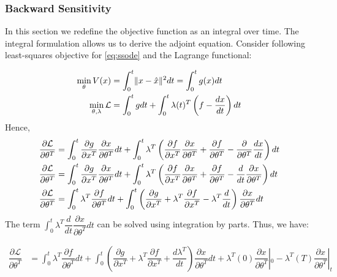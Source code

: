\documentclass[fontsize=11pt]{article}
\newcommand{\norm}[1]{\lVert #1 \rVert}
\theoremstyle{definition}
\begin{document}
\subsubsection{Backward Sensitivity}

In this section we redefine the objective function as an integral over time.
The integral formulation allows us to derive the adjoint equation.
Consider following least-squares objective for \cref{eq:ssode} and the Lagrange functional:

\begin{align}
    \min\limits_{\theta}V(x) &= \int_0^t \norm{x - \hat{x}}^2 dt = \int_0^t g(x)dt \notag \\
    \min\limits_{\theta, \lambda}\mathcal{L} &= \int_0^t g dt + \int_0^t \lambda(t)^T \left(f - \dfrac{dx}{dt}\right) dt
\end{align}
Hence,
\begin{align}
    \dfrac{\partial \mathcal{L}}{\partial \theta^T} &= \int_0^t \dfrac{\partial g}{\partial x^T} \dfrac{\partial x}{\partial \theta^T} dt + 
    \int_0^t \lambda^T \left(\dfrac{\partial f}{\partial x^T} \dfrac{\partial x}{\partial \theta^T} + \dfrac{\partial f}{\partial \theta^T} - \dfrac{\partial}{\partial \theta^T}\dfrac{dx}{dt}\right) dt \notag \\
    \dfrac{\partial \mathcal{L}}{\partial \theta^T} &= \int_0^t \dfrac{\partial g}{\partial x^T} \dfrac{\partial x}{\partial \theta^T} dt + 
    \int_0^t \lambda^T \left(\dfrac{\partial f}{\partial x^T} \dfrac{\partial x}{\partial \theta^T} + \dfrac{\partial f}{\partial \theta^T} - \dfrac{d}{dt}\dfrac{\partial x}{\partial \theta^T}\right) dt \notag \\
    \dfrac{\partial \mathcal{L}}{\partial \theta^T} &= \int_0^t \lambda^T \dfrac{\partial f}{\partial \theta^T} dt + \int_0^t \left(\dfrac{\partial g}{\partial x^T}
    + \lambda^T \dfrac{\partial f}{\partial x^T} - \lambda^T\dfrac{d}{dt}\right)\dfrac{\partial x}{\partial \theta^T} dt
\end{align}
The term $\int_0^t{\lambda^T \dfrac{d}{dt} \dfrac{\partial x}{\partial \theta^T}dt}$ 
can be solved using integration by parts. Thus, we have:

\begin{align}
    \dfrac{\partial \mathcal{L}}{\partial \theta^T} &= \int_0^t \lambda^T \dfrac{\partial f}{\partial \theta^T} dt + \int_0^t \left(\dfrac{\partial g}{\partial x^T}
    + \lambda^T \dfrac{\partial f}{\partial x^T} + \dfrac{d\lambda^T}{dt}\right)\dfrac{\partial x}{\partial \theta^T} dt + \lambda^T(0)\dfrac{\partial x}{\partial \theta^T}|_0
    - \lambda^T(T)\dfrac{\partial x}{\partial \theta^T}|_t
    \label{eq:adjoint}
\end{align}
\end{document}
